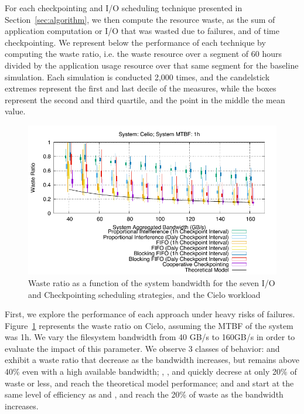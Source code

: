 For each checkpointing and I/O scheduling technique presented in
Section~\ref{sec:algorithm}, we then compute the resource waste, as
the sum of application computation or I/O that was wasted due to
failures, and of time checkpointing. We represent below the
performance of each technique by computing the waste ratio, i.e. the
waste resource over a segment of 60 hours divided by the application
usage resource over that same segment for the baseline
simulation. Each simulation is conducted 2,000 times, and the
candelstick extremes represent the first and last decile of the
measures, while the boxes represent the second and third quartile, and
the point in the middle the mean value.

\begin{figure}
  \begin{center}
    \includegraphics[width=\linewidth]{sim/figures/synthetic-01hMTBF-waste-celio.pdf}
  \end{center}
  \caption{Waste ratio as a function of the system bandwidth for the
    seven I/O and Checkpointing scheduling strategies, and the Cielo
    workload \label{fig:cielo-1hmtbf}}
\end{figure}

First, we explore the performance of each approach under heavy risks
of failures. Figure~\ref{fig:cielo-1hmtbf} represents the waste ratio
on Cielo, assuming the MTBF of the system was 1h. We vary the
filesystem bandwidth from 40 GB/s to 160GB/s in order to evaluate the
impact of this parameter. We observe 3 classes of behavior: \propfixed
and \bfifofixed exhibit a waste ratio that decrease as the bandwidth
increases, but remains above 40\% even with a high available
bandwidth; \fifodaly, \fifofixed, and \cooperative quickly decrese at
only 20\% of waste or less, and reach the theoretical model
performance; and \propdaly and \bfifodaly start at the same level of
efficiency as \propfixed and \bfifofixed, and reach the 20\% of waste
as the bandwidth increases.

